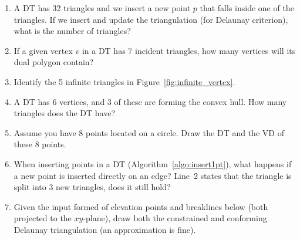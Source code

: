 \begin{enumerate}
  \item A DT has 32 triangles and we insert a new point $p$ that falls inside one of the triangles. If we insert and update the triangulation (for Delaunay criterion), what is the number of triangles?
  \item If a given vertex $v$ in a DT has 7 incident triangles, how many vertices will its dual polygon contain?
  \item Identify the 5 infinite triangles in Figure~\ref{fig:infinite_vertex}.
  \item A DT has 6 vertices, and 3 of these are forming the convex hull. How many triangles does the DT have?
  \item Assume you have 8 points located on a circle. Draw the DT and the VD of these 8 points.
  \item When inserting points in a DT (Algorithm~\ref{algo:insert1pt}), what happens if a new point is inserted directly on an edge? Line~2 states that the triangle is split into 3 new triangles, does it still hold?
  \item Given the input formed of elevation points and breaklines below (both projected to the $xy$-plane), draw both the constrained and conforming Delaunay triangulation (an approximation is fine).
  \\ \\
\end{enumerate}
